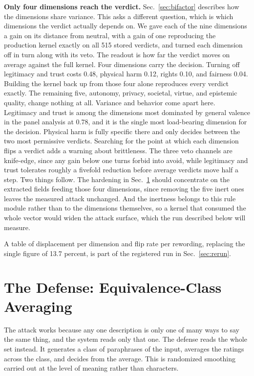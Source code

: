 \documentclass[journal]{IEEEtran}
\begin{document}
\textbf{Only four dimensions reach the verdict.} Sec.~\ref{sec:bifactor}
describes how the dimensions share variance. This asks a different question,
which is which dimensions the verdict actually depends on. We gave each of
the nine dimensions a gain on its distance from neutral, with a gain of one
reproducing the production kernel exactly on all 515 stored verdicts, and
turned each dimension off in turn along with its veto. The readout is how far
the verdict moves on average against the full kernel. Four dimensions carry
the decision. Turning off legitimacy and trust costs 0.48, physical harm
0.12, rights 0.10, and fairness 0.04. Building the kernel back up from those
four alone reproduces every verdict exactly. The remaining five, autonomy,
privacy, societal, virtue, and epistemic quality, change nothing at all.
Variance and behavior come apart here. Legitimacy and trust is among the
dimensions most dominated by general valence in the panel analysis at 0.78,
and it is the single most load-bearing dimension for the decision. Physical
harm is fully specific there and only decides between the two most permissive
verdicts. Searching for the point at which each dimension flips a verdict
adds a warning about brittleness. The three veto channels are knife-edge,
since any gain below one turns forbid into avoid, while legitimacy and trust
tolerates roughly a fivefold reduction before average verdicts move half a
step. Two things follow. The hardening in Sec.~\ref{sec:defense} should
concentrate on the extracted fields feeding those four dimensions, since
removing the five inert ones leaves the measured attack unchanged. And the
inertness belongs to this rule module rather than to the dimensions
themselves, so a kernel that consumed the whole vector would widen the attack
surface, which the run described below will measure.

A table of displacement per dimension and flip rate per rewording, replacing
the single figure of 13.7 percent, is part of the registered run in
Sec.~\ref{sec:rerun}.

\section{The Defense: Equivalence-Class Averaging}
\label{sec:defense}

The attack works because any one description is only one of many ways to say
the same thing, and the system reads only that one. The defense reads the
whole set instead. It generates a class of paraphrases of the input, averages
the ratings across the class, and decides from the average. This is
randomized smoothing~\cite{cohen2019certified,robey2023smoothllm} carried out
at the level of meaning rather than characters.
\end{document}
